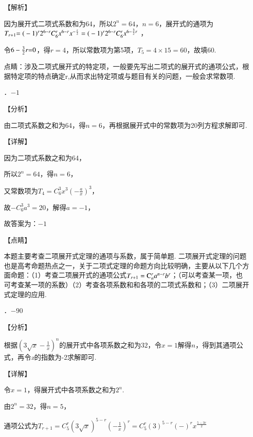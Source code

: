 \documentclass[a4paper,11pt,UTF8,twoside]{ctexart} %
\begin{document}
\noindent 【解析】

\noindent 因为展开式二项式系数和为64，所以$2^{n} =64$，$n=6$，展开式的通项为$T_{r{\rm +}1} {\rm =(}-1)^{r} {\rm 2}^{6-r} C_{6}^{r} x^{6-r} x^{-\frac{r}{2} } ={\rm (}-1)^{r} {\rm 2}^{6-r} C_{6}^{r} x^{6-\frac{3}{2} r} $ ，

\noindent 令$6-\frac{3}{2} r{\rm =}0$，得$r=4$，所以常数项为第5项，$T_{5} =4\times 15=60$，故填$60$.   $ $ 

\noindent 点睛：涉及二项式展开式的特定项，一般要先写出二项式的展开式的通项公式，根据特定项的特点确定r,从而求出特定项或与题目有关的问题，一般会求常数项.

．$-1$

\noindent 【分析】

\noindent 由二项式系数之和为64，得$n=6$，再根据展开式中的常数项为20列方程求解即可.

\noindent 【详解】

\noindent 因为二项式系数之和为64，

\noindent 所以$2^{n} =64$，得$n=6$，

\noindent 又常数项为$T_{4} =C_{6}^{3} x^{3} \left(-\frac{a}{x} \right)^{3} $，

\noindent 故$-C_{6}^{3} a^{3} =20$，解得$a=-1$，

\noindent 故答案为：$-1$

\noindent 【点睛】

\noindent 本题主要考查二项展开式定理的通项与系数，属于简单题. 二项展开式定理的问题也是高考命题热点之一，关于二项式定理的命题方向比较明确，主要从以下几个方面命题：（1）考查二项展开式的通项公式$T_{r+1} ={\rm C}_{n}^{r} a^{n-r} b^{r} $；（可以考查某一项，也可考查某一项的系数）（2）考查各项系数和和各项的二项式系数和；（3）二项展开式定理的应用.

．$-90$

\noindent 【分析】

\noindent 根据$\left(3\sqrt{x} -\frac{1}{x} \right)^{n} $的展开式中各项系数之和为$32$，令$x=1$解得$n$，得到其通项公式，再令\textit{x}的指数为-2求解即可.

\noindent 【详解】

\noindent 令$x=1$，得展开式中各项系数之和为$2^{n} $.

\noindent 由$2^{n} =32$，得$n=5$，

\noindent 通项公式为$T_{r+1} =C_{5}^{r} \left(3\sqrt{x} \right)^{5-r} \left(-\frac{1}{x} \right)^{r} =C_{5}^{r} \left(3\right)^{5-r} \left(-\right)^{r} x^{\frac{5-3r}{2} } $
\end{document}
